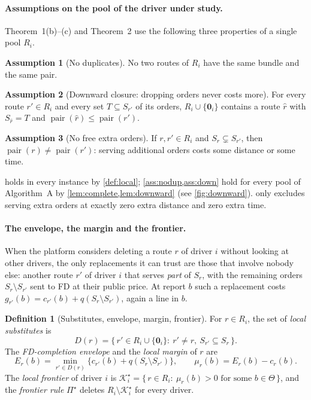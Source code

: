 \documentclass[11pt]{article}
\theoremstyle{definition}
\newtheorem{definition}{Definition}
\newtheorem{assumption}{Assumption}
\theoremstyle{remark}
\newcommand{\Ks}{\mathcal{K}^{\star}}
\newcommand{\idle}{\mathbf{0}}
\newcommand{\pair}{\operatorname{pair}}
\begin{document}
\paragraph{Assumptions on the pool of the driver under study.}
Theorem~1(b)--(c) and Theorem~2 use the following three properties of a single
pool $R_i$.

\begin{assumption}[No duplicates]\label{ass:nodup}
No two routes of $R_i$ have the same bundle and the same pair.
\end{assumption}

\begin{assumption}[Downward closure: dropping orders never costs more]\label{ass:down}
For every route $r'\in R_i$ and every set $T\subseteq S_{r'}$ of its orders,
$R_i\cup\{\idle_i\}$ contains a route $\hat r$ with $S_{\hat r}=T$ and
$\pair(\hat r)\le\pair(r')$.
\end{assumption}

\begin{assumption}[No free extra orders]\label{ass:nofree}
If $r,r'\in R_i$ and $S_r\subsetneq S_{r'}$, then $\pair(r)\ne\pair(r')$:
serving additional orders costs some distance or some time.
\end{assumption}

 holds in every instance by \cref{def:local};
\cref{ass:nodup,ass:down} hold for every pool of Algorithm~A by
\cref{lem:complete,lem:downward} (see \cref{fig:downward}).
 only excludes serving extra orders at exactly zero extra
distance and zero extra time.

\paragraph{The envelope, the margin and the frontier.}
When the platform considers deleting a route $r$ of driver $i$ without looking
at other drivers, the only replacements it can trust are those that involve
nobody else: another route $r'$ of driver $i$ that serves \emph{part} of $S_r$,
with the remaining orders $S_r\setminus S_{r'}$ sent to FD at their public
price. At report $b$ such a replacement costs
$g_{r'}(b)=c_{r'}(b)+q(S_r\setminus S_{r'})$, again a line in $b$.

\begin{definition}[Substitutes, envelope, margin, frontier]\label{def:frontier}
For $r\in R_i$, the set of \emph{local substitutes} is
\[
D(r)=\bigl\{\,r'\in R_i\cup\{\idle_i\}:\ r'\ne r,\ S_{r'}\subseteq S_r\,\bigr\}.
\]
The \emph{FD-completion envelope} and the \emph{local margin} of $r$ are
\[
E_r(b)=\min_{r'\in D(r)}\bigl\{c_{r'}(b)+q(S_r\setminus S_{r'})\bigr\},
\qquad
\mu_r(b)=E_r(b)-c_r(b).
\]
The \emph{local frontier} of driver $i$ is
$\Ks_i=\{\,r\in R_i:\ \mu_r(b)>0\text{ for some }b\in\Theta\,\}$, and the
\emph{frontier rule} $\Pi^\star$ deletes $R_i\setminus\Ks_i$ for every driver.
\end{definition}
\end{document}
